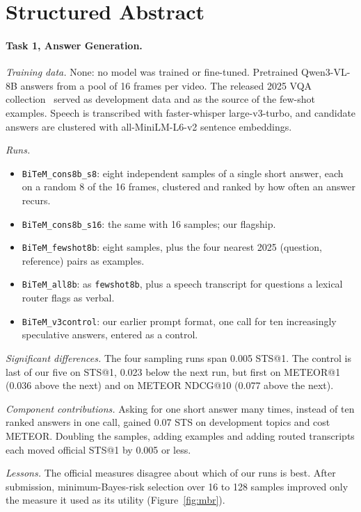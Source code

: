 \documentclass[sigconf,nonacm]{acmart}
\begin{document}
\section*{Structured Abstract}

\paragraph{Task 1, Answer Generation.}
\emph{Training data.} None: no model was trained or fine-tuned. Pretrained
Qwen3-VL-8B answers from a pool of 16 frames per video. The released 2025 VQA
collection~\cite{awad2025vqa} served as development data and as the source of
the few-shot examples. Speech is transcribed with faster-whisper large-v3-turbo,
and candidate answers are clustered with all-MiniLM-L6-v2 sentence embeddings.

\emph{Runs.}
\begin{itemize}\setlength{\itemsep}{1pt}
\item \texttt{BiTeM\_cons8b\_s8}: eight independent samples of a single short
answer, each on a random 8 of the 16 frames, clustered and ranked by how often
an answer recurs.
\item \texttt{BiTeM\_cons8b\_s16}: the same with 16 samples; our flagship.
\item \texttt{BiTeM\_fewshot8b}: eight samples, plus the four nearest 2025
(question, reference) pairs as examples.
\item \texttt{BiTeM\_all8b}: as \texttt{fewshot8b}, plus a speech transcript for
questions a lexical router flags as verbal.
\item \texttt{BiTeM\_v3control}: our earlier prompt format, one call for ten
increasingly speculative answers, entered as a control.
\end{itemize}

\emph{Significant differences.} The four sampling runs span 0.005 STS@1. The
control is last of our five on STS@1, 0.023 below the next run, but first on
METEOR@1 (0.036 above the next) and on METEOR NDCG@10 (0.077 above the next).

\emph{Component contributions.} Asking for one short answer many times, instead
of ten ranked answers in one call, gained 0.07 STS on development topics and
cost METEOR. Doubling the samples, adding examples and adding routed transcripts
each moved official STS@1 by 0.005 or less.

\emph{Lessons.} The official measures disagree about which of our runs is best.
After submission, minimum-Bayes-risk selection over 16 to 128 samples improved
only the measure it used as its utility (Figure~\ref{fig:mbr}).
\end{document}
